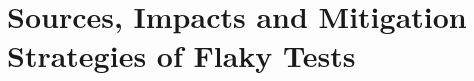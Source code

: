 \chapter{Sources, Impacts and Mitigation Strategies of Flaky Tests}
\label{chap:survey}

\chapterPage{
}







